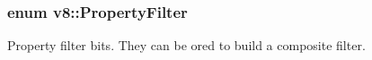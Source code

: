 \subsubsection[{\texorpdfstring{Property\+Filter}{PropertyFilter}}]{\setlength{\rightskip}{0pt plus 5cm}enum {\bf v8\+::\+Property\+Filter}}\hypertarget{namespacev8_afbf02b6b1152a3e25d7bde90798209ac}{}\label{namespacev8_afbf02b6b1152a3e25d7bde90798209ac}
Property filter bits. They can be or\textquotesingle{}ed to build a composite filter. 
